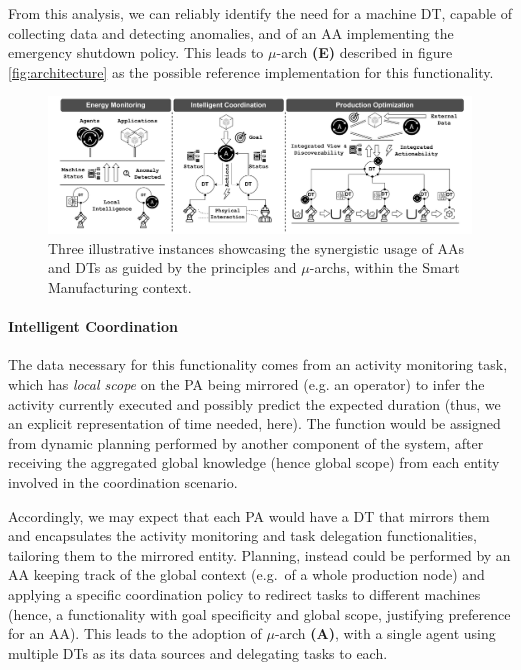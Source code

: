 From this analysis, we can reliably identify the need for a machine DT, capable of collecting data and detecting anomalies, and of an AA implementing the emergency shutdown policy. 
This leads to $\mu$-arch \textbf{(E)} described in figure \ref{fig:architecture} as the possible reference implementation for this functionality. 

\begin{figure}
    \centering
    \includegraphics[width=\columnwidth]{figures/dt-mas/dt_agents_zoom.pdf}
    \caption{Three  illustrative instances showcasing the synergistic usage of AAs and DTs as guided by the principles and $\mu$-archs, within the Smart Manufacturing context.}
    \label{fig:dt_agents_zoom}
\end{figure}

\paragraph{Intelligent Coordination}

The data necessary for this functionality comes from an activity monitoring task, which has \emph{local scope} on the PA being mirrored (e.g. an operator) to infer the activity currently executed and possibly predict the expected duration (thus, we an explicit representation of time needed, here). 
%
The function would be assigned from dynamic planning performed by another component of the system, after receiving the aggregated global knowledge (hence global scope) from each entity involved in the coordination scenario.

Accordingly, we may expect that each PA would have a DT that mirrors them and encapsulates the activity monitoring and task delegation functionalities, tailoring them to the mirrored entity. 
Planning, instead could be performed by an AA keeping track of the global context (e.g.\ of a whole production node) and applying a specific coordination policy to redirect tasks to different machines (hence, a functionality with goal specificity and global scope, justifying preference for an AA). 
This leads to the adoption of $\mu$-arch \textbf{(A)}, with a single agent using multiple DTs as its data sources and delegating tasks to each.

